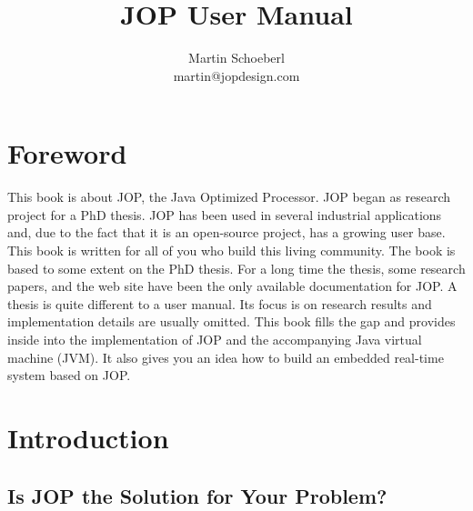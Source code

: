 





\title{JOP User Manual}
\author{Martin Schoeberl\\martin@jopdesign.com}
\maketitle \thispagestyle{empty}

%


%

\pagestyle{scrheadings} 

\tableofcontents \cleardoublepage
 \listoftables \newpage \listoffigures
 \newpage \lstlistoflistings \newpage

\chapter*{Foreword}

This book is about JOP, the Java Optimized Processor. JOP began as
research project for a PhD thesis. JOP has been used in several
industrial applications and, due to the fact that it is an
open-source project, has a growing user base. This book is written
for all of you who build this living community. The book is based to
some extent on the PhD thesis. For a long time the thesis, some
research papers, and the web site  have been the only available
documentation for JOP. A thesis is quite different to a user manual.
Its focus is on research results and implementation details are
usually omitted. This book fills the gap and provides inside into
the implementation of JOP and the accompanying Java virtual machine
(JVM). It also gives you an idea how to build an embedded real-time
system based on JOP.


\pagestyle{scrheadings} 



\chapter{Introduction}
\label{chap:intro}
%    
\section{Is JOP the Solution for Your Problem?}


